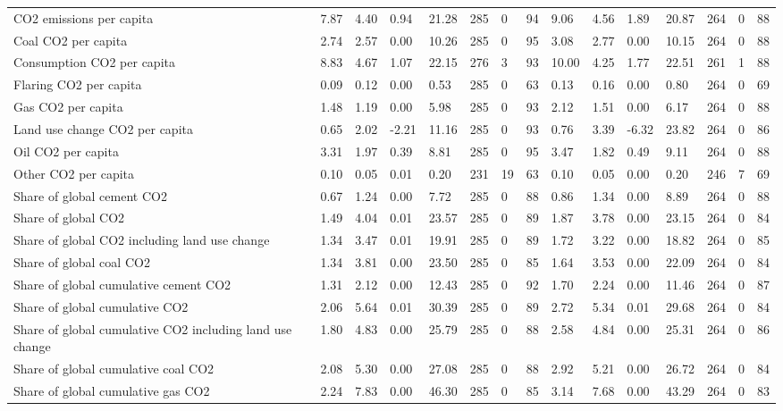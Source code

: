 \begin{longtable}{lllllllllllllll}
CO2 emissions per capita & 7.87 & 4.40 & 0.94 & 21.28 & 285 & 0 & 94 & 9.06 & 4.56 & 1.89 & 20.87 & 264 & 0 & 88\\
Coal CO2 per capita & 2.74 & 2.57 & 0.00 & 10.26 & 285 & 0 & 95 & 3.08 & 2.77 & 0.00 & 10.15 & 264 & 0 & 88\\
Consumption CO2 per capita & 8.83 & 4.67 & 1.07 & 22.15 & 276 & 3 & 93 & 10.00 & 4.25 & 1.77 & 22.51 & 261 & 1 & 88\\
\addlinespace
Flaring CO2 per capita & 0.09 & 0.12 & 0.00 & 0.53 & 285 & 0 & 63 & 0.13 & 0.16 & 0.00 & 0.80 & 264 & 0 & 69\\
Gas CO2 per capita & 1.48 & 1.19 & 0.00 & 5.98 & 285 & 0 & 93 & 2.12 & 1.51 & 0.00 & 6.17 & 264 & 0 & 88\\
Land use change CO2 per capita & 0.65 & 2.02 & -2.21 & 11.16 & 285 & 0 & 93 & 0.76 & 3.39 & -6.32 & 23.82 & 264 & 0 & 86\\
Oil CO2 per capita & 3.31 & 1.97 & 0.39 & 8.81 & 285 & 0 & 95 & 3.47 & 1.82 & 0.49 & 9.11 & 264 & 0 & 88\\
Other CO2 per capita & 0.10 & 0.05 & 0.01 & 0.20 & 231 & 19 & 63 & 0.10 & 0.05 & 0.00 & 0.20 & 246 & 7 & 69\\
\addlinespace
Share of global cement CO2 & 0.67 & 1.24 & 0.00 & 7.72 & 285 & 0 & 88 & 0.86 & 1.34 & 0.00 & 8.89 & 264 & 0 & 88\\
Share of global CO2 & 1.49 & 4.04 & 0.01 & 23.57 & 285 & 0 & 89 & 1.87 & 3.78 & 0.00 & 23.15 & 264 & 0 & 84\\
Share of global CO2 including land use change & 1.34 & 3.47 & 0.01 & 19.91 & 285 & 0 & 89 & 1.72 & 3.22 & 0.00 & 18.82 & 264 & 0 & 85\\
Share of global coal CO2 & 1.34 & 3.81 & 0.00 & 23.50 & 285 & 0 & 85 & 1.64 & 3.53 & 0.00 & 22.09 & 264 & 0 & 84\\
Share of global cumulative cement CO2 & 1.31 & 2.12 & 0.00 & 12.43 & 285 & 0 & 92 & 1.70 & 2.24 & 0.00 & 11.46 & 264 & 0 & 87\\
\addlinespace
Share of global cumulative CO2 & 2.06 & 5.64 & 0.01 & 30.39 & 285 & 0 & 89 & 2.72 & 5.34 & 0.01 & 29.68 & 264 & 0 & 84\\
Share of global cumulative CO2 including land use change & 1.80 & 4.83 & 0.00 & 25.79 & 285 & 0 & 88 & 2.58 & 4.84 & 0.00 & 25.31 & 264 & 0 & 86\\
Share of global cumulative coal CO2 & 2.08 & 5.30 & 0.00 & 27.08 & 285 & 0 & 88 & 2.92 & 5.21 & 0.00 & 26.72 & 264 & 0 & 84\\
Share of global cumulative gas CO2 & 2.24 & 7.83 & 0.00 & 46.30 & 285 & 0 & 85 & 3.14 & 7.68 & 0.00 & 43.29 & 264 & 0 & 83\\

\end{longtable}
